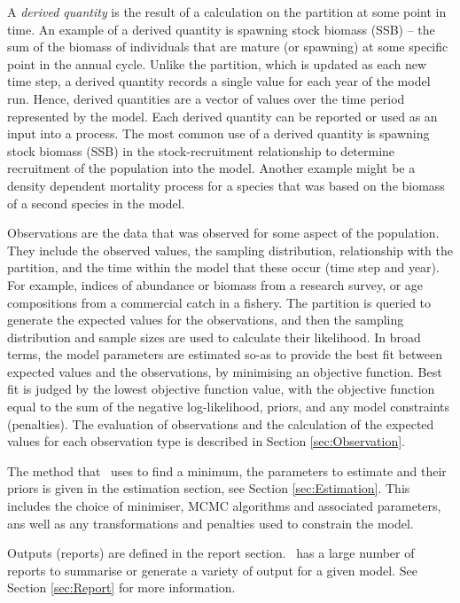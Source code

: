 A \emph{derived quantity} is the result of a calculation on the partition at some point in time. An example of a derived quantity is spawning stock biomass (SSB) -- the sum of the biomass of individuals that are mature (or spawning) at some specific point in the annual cycle. Unlike the partition, which is updated as each new time step, a derived quantity records a single value for each year of the model run. Hence, derived quantities are a vector of values over the time period represented by the model. Each derived quantity can be reported or used as an input into a process. The most common use of a derived quantity is spawning stock biomass (SSB) in the stock-recruitment relationship to determine recruitment of the population into the model. Another example might be a density dependent mortality process for a species that was based on the biomass of a second species in the model.

Observations are the data that was observed for some aspect of the population. They include the observed values, the sampling distribution, relationship with the partition, and the time within the model that these occur (time step and year). For example, indices of abundance or biomass from a research survey, or age compositions from a commercial catch in a fishery. The partition is queried to generate the expected values for the observations, and then the sampling distribution and sample sizes are used to calculate their likelihood. In broad terms, the model parameters are estimated so-as to provide the best fit between expected values and the observations, by minimising an objective function. Best fit is judged by the lowest objective function value, with the objective function equal to the sum of the negative log-likelihood, priors, and any model constraints (penalties). The evaluation of observations and the calculation of the expected values for each observation type is described in Section \ref{sec:Observation}.

The method that \CNAME\ uses to find a minimum, the parameters to estimate and their priors is given in the estimation section, see Section \ref{sec:Estimation}. This includes the choice of minimiser, MCMC algorithms and associated parameters, ans well as any transformations and penalties used to constrain the model.

Outputs (reports) are defined in the report section. \CNAME\  has a large number of reports to summarise or generate a variety of output for a given model. See Section \ref{sec:Report} for more information.


